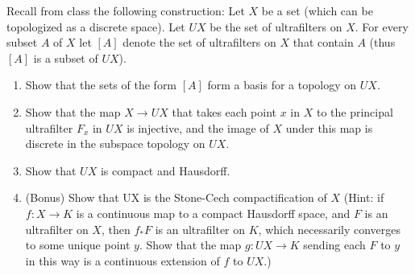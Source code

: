 \documentclass[a4paper, 10pt]{article}
\begin{document}
\begin{problem} [Problem 2]
    Recall from class the following construction: Let $X$ be a set (which can be topologized as a discrete space). Let $UX$ be the set of ultrafilters on $X$. For every subset $A$ of $X$ let $[A]$ denote the set of ultrafilters on $X$ that contain $A$ (thus $[A]$ is a subset of $UX$).
    \begin{enumerate}
    \item Show that the sets of the form $[A]$ form a basis for a topology on $UX$.
    \item Show that the map $X \to UX$ that takes each point $x$ in $X$ to the principal ultrafilter $F_x$ in $UX$ is injective, and the image of $X$ under this map is discrete in the subspace topology on $UX$.
    \item Show that $UX$ is compact and Hausdorff.
    \item (Bonus) Show that UX is the Stone-Cech compactification of $X$ (Hint: if $f:X \to K$ is a continuous map to a compact Hausdorff space, and $F$ is an ultrafilter on $X$, then $f_*F$ is an ultrafilter on $K$, which necessarily converges to some unique point $y$. Show that the map $g: UX \to K$ sending each $F$ to $y$ in this way is a continuous extension of $f$ to $UX$.)
    \end{enumerate}
\end{problem}
\end{document}
